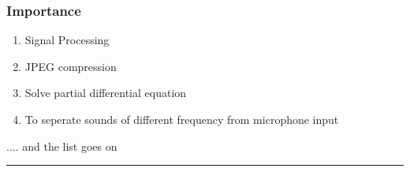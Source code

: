 \subsubsection{Importance}
\begin{enumerate}
	\item{Signal Processing}
	\item{JPEG compression}
	\item{Solve partial differential equation}
	\item{To seperate sounds of different frequency from microphone input}
\end{enumerate}
.... and the list goes on

\hrule
